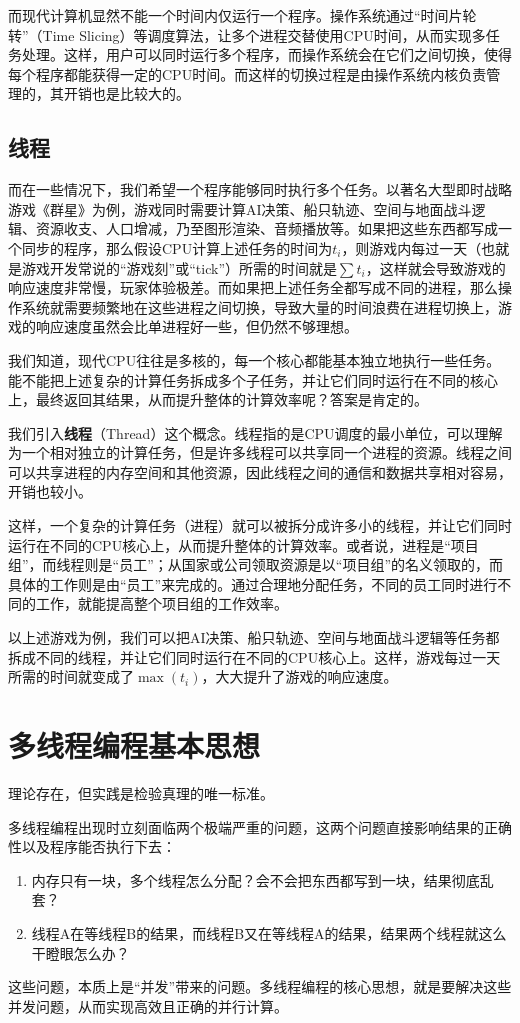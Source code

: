 而现代计算机显然不能一个时间内仅运行一个程序。操作系统通过“时间片轮转”（Time Slicing）等调度算法，让多个进程交替使用CPU时间，从而实现多任务处理。这样，用户可以同时运行多个程序，而操作系统会在它们之间切换，使得每个程序都能获得一定的CPU时间。而这样的切换过程是由操作系统内核负责管理的，其开销也是比较大的。

\subsection{线程}

而在一些情况下，我们希望一个程序能够同时执行多个任务。以著名大型即时战略游戏《群星》为例，游戏同时需要计算AI决策、船只轨迹、空间与地面战斗逻辑、资源收支、人口增减，乃至图形渲染、音频播放等。如果把这些东西都写成一个同步的程序，那么假设CPU计算上述任务的时间为$t_i$，则游戏内每过一天（也就是游戏开发常说的“游戏刻”或“tick”）所需的时间就是$\sum t_i$，这样就会导致游戏的响应速度非常慢，玩家体验极差。而如果把上述任务全都写成不同的进程，那么操作系统就需要频繁地在这些进程之间切换，导致大量的时间浪费在进程切换上，游戏的响应速度虽然会比单进程好一些，但仍然不够理想。

我们知道，现代CPU往往是多核的，每一个核心都能基本独立地执行一些任务。能不能把上述复杂的计算任务拆成多个子任务，并让它们同时运行在不同的核心上，最终返回其结果，从而提升整体的计算效率呢？答案是肯定的。

我们引入\textbf{线程}（Thread）这个概念。线程指的是CPU调度的最小单位，可以理解为一个相对独立的计算任务，但是许多线程可以共享同一个进程的资源。线程之间可以共享进程的内存空间和其他资源，因此线程之间的通信和数据共享相对容易，开销也较小。

这样，一个复杂的计算任务（进程）就可以被拆分成许多小的线程，并让它们同时运行在不同的CPU核心上，从而提升整体的计算效率。或者说，进程是“项目组”，而线程则是“员工”；从国家或公司领取资源是以“项目组”的名义领取的，而具体的工作则是由“员工”来完成的。通过合理地分配任务，不同的员工同时进行不同的工作，就能提高整个项目组的工作效率。

以上述游戏为例，我们可以把AI决策、船只轨迹、空间与地面战斗逻辑等任务都拆成不同的线程，并让它们同时运行在不同的CPU核心上。这样，游戏每过一天所需的时间就变成了$\max(t_i)$，大大提升了游戏的响应速度。

\section{多线程编程基本思想}

理论存在，但实践是检验真理的唯一标准。

多线程编程出现时立刻面临两个极端严重的问题，这两个问题直接影响结果的正确性以及程序能否执行下去：
\begin{enumerate}
    \item 内存只有一块，多个线程怎么分配？会不会把东西都写到一块，结果彻底乱套？
    \item 线程A在等线程B的结果，而线程B又在等线程A的结果，结果两个线程就这么干瞪眼怎么办？
\end{enumerate}
这些问题，本质上是“并发”带来的问题。多线程编程的核心思想，就是要解决这些并发问题，从而实现高效且正确的并行计算。

